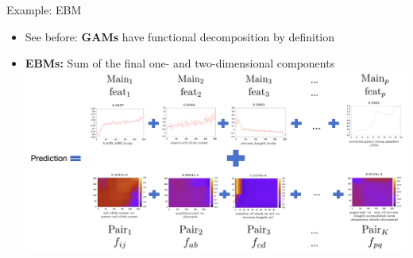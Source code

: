 \documentclass[11pt,compress,t,notes=noshow, aspectratio=169, xcolor=table]{beamer}
\begin{document}
\begin{frame}{Example: EBM}

    \begin{itemize}
        \item See before: \textbf{GAMs} have functional decomposition by definition
        \item \textbf{EBMs:} Sum of the final one- and two-dimensional components
        {
        \centering
        \includegraphics[width=\linewidth]{figure/final_ebm.png}
        }
    \end{itemize}
    
\end{frame}



\endlecture
\end{document}
